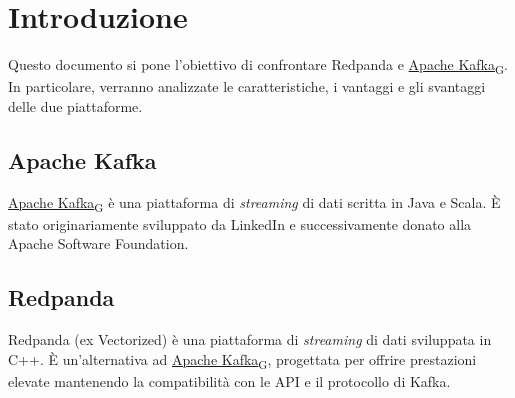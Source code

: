 \section{Introduzione}
Questo documento si pone l'obiettivo di confrontare Redpanda e \href{https://7last.github.io/docs/rtb/documentazione-interna/glossario\#apache-kafka}{Apache Kafka\textsubscript{G}}.
In particolare, verranno analizzate le caratteristiche, i vantaggi e gli svantaggi delle due piattaforme.\\

\subsection{Apache Kafka}
\href{https://7last.github.io/docs/rtb/documentazione-interna/glossario\#apache-kafka}{Apache Kafka\textsubscript{G}} è una piattaforma di \textit{streaming} di dati scritta in Java e Scala.
È stato originariamente sviluppato da LinkedIn e successivamente donato alla Apache Software Foundation.

\subsection{Redpanda}
Redpanda (ex Vectorized) è una piattaforma di \textit{streaming} di dati sviluppata in C++.
È un'alternativa ad \href{https://7last.github.io/docs/rtb/documentazione-interna/glossario\#apache-kafka}{Apache Kafka\textsubscript{G}}, progettata per offrire prestazioni elevate
mantenendo la compatibilità con le API e il protocollo di Kafka.

